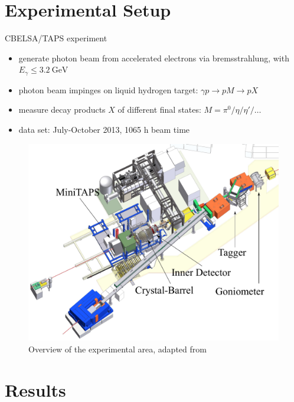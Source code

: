 \documentclass[11pt,aspectratio=169,dvipsnames]{beamer}
\begin{document}
	\section{Experimental Setup}
	\begin{frame}{CBELSA/TAPS experiment}
		\begin{minipage}{.3\linewidth}
			{\small
				\begin{itemize}
					\item generate photon beam from accelerated electrons via bremsstrahlung, with $E_\gamma\leq\SI{3.2}{\giga\eV}$ 
					\item photon beam impinges on liquid hydrogen target: $\gamma p \to p M\to p X$
					\item measure decay products $X$ of different final states: $M=\pi^0/\eta/\eta'/\dots$
					\item data set: July-October 2013, 1065 h beam time
				\end{itemize}
			}
		\end{minipage}
		\begin{minipage}{.69\linewidth}
			\begin{figure}
				\centering
				\includegraphics[width=.9\linewidth]{CB-Area}
				\caption*{Overview of the experimental area, adapted from }
			\end{figure}
		\end{minipage}
		
	\end{frame}

	
	
	\section{Results}
\end{document}
